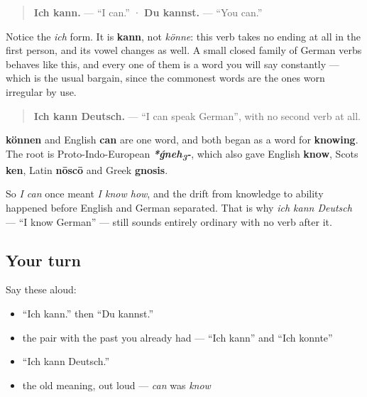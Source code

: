 \begin{quote}
\textbf{Ich kann.} — \textquotedblleft{}I can.\textquotedblright{} · \textbf{Du kannst.} — \textquotedblleft{}You can.\textquotedblright{}
\end{quote}

Notice the \emph{ich} form. It is \textbf{kann}, not \emph{könne}: this verb takes no ending at all in the first person, and its vowel changes as well. A small closed family of German verbs behaves like this, and every one of them is a word you will say constantly — which is the usual bargain, since the commonest words are the ones worn irregular by use.

\begin{quote}
\textbf{Ich kann Deutsch.} — \textquotedblleft{}I can speak German\textquotedblright{}, with no second verb at all.
\end{quote}

\begin{cousinweb}
\textbf{können} and English \textbf{can} are one word, and both began as a word for \textbf{knowing}. The root is Proto-Indo-European \emph{\textbf{*ǵneh\textsubscript{3}-}}, which also gave English \textbf{know}, Scots \textbf{ken}, Latin \textbf{nōscō} and Greek \textbf{gnosis}.

So \emph{I can} once meant \emph{I know how}, and the drift from knowledge to ability happened before English and German separated. That is why \emph{ich kann Deutsch} — \textquotedblleft{}I know German\textquotedblright{} — still sounds entirely ordinary with no verb after it.
\end{cousinweb}

\subsection*{Your turn}
Say these aloud:

\begin{itemize}
\raggedright
  \item \textquotedblleft{}Ich kann.\textquotedblright{} then \textquotedblleft{}Du kannst.\textquotedblright{}
  \item the pair with the past you already had — \textquotedblleft{}Ich kann\textquotedblright{} and \textquotedblleft{}Ich konnte\textquotedblright{}
  \item \textquotedblleft{}Ich kann Deutsch.\textquotedblright{}
  \item the old meaning, out loud — \emph{can} was \emph{know}
\end{itemize}


